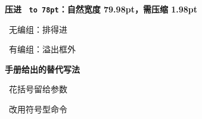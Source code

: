 \documentclass[12pt]{article}
\begin{document}
\textbf{压进 \texttt{\string\hbox\ to\ 78pt}：自然宽度 79.98pt，需压缩 1.98pt}

\medskip
{}\ 无编组：排得进

\medskip
{}\ 有编组：溢出框外

\bigskip
\textbf{手册给出的替代写法}

\medskip
{}\ 花括号留给参数

\medskip
{}\ 改用符号型命令
\end{document}
